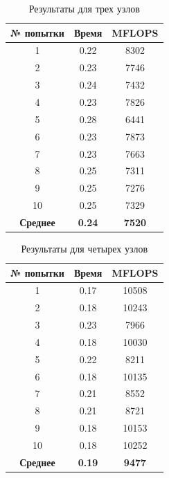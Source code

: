 \begin{table}[H]
	\caption{Результаты для трех узлов}
	\centering
	\begin{tabular}{|c|c|c|}
		\hline
		\textbf{№ попытки} & \textbf{Время} & \textbf{MFLOPS} \\\hline
		1 & 0.22 & 8302 \\ \hline
		2 & 0.23 & 7746 \\ \hline
		3 & 0.24 & 7432 \\ \hline
		4 & 0.23 & 7826 \\ \hline
		5 & 0.28 & 6441 \\ \hline
		6 & 0.23 & 7873 \\ \hline
		7 & 0.23 & 7663 \\ \hline
		8 & 0.25 & 7311 \\ \hline
		9 & 0.25 & 7276 \\ \hline
		10 & 0.25 & 7329 \\ \hline
		\textbf{Среднее} & \textbf{0.24} & \textbf{7520} \\\hline
	\end{tabular}
	\label{res/03}
\end{table}


\begin{table}[H]
		\caption{Результаты для четырех узлов}
	\centering
	\begin{tabular}{|c|c|c|}
		\hline
		\textbf{№ попытки} & \textbf{Время} & \textbf{MFLOPS} \\\hline
		1 & 0.17 & 10508 \\ \hline
		2 & 0.18 & 10243 \\ \hline
		3 & 0.23 & 7966 \\ \hline
		4 & 0.18 & 10030 \\ \hline
		5 & 0.22 & 8211 \\ \hline
		6 & 0.18 & 10135 \\ \hline
		7 & 0.21 & 8552 \\ \hline
		8 & 0.21 & 8721 \\ \hline
		9 & 0.18 & 10153 \\ \hline
		10 & 0.18 & 10252 \\ \hline
		\textbf{Среднее} & \textbf{0.19} & \textbf{9477} \\\hline
	\end{tabular}
	\label{res/04}
\end{table}


